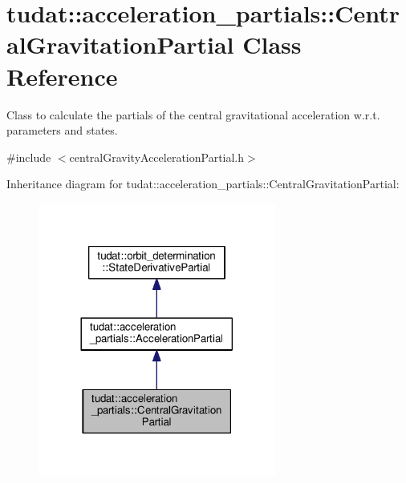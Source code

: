 \hypertarget{classtudat_1_1acceleration__partials_1_1CentralGravitationPartial}{}\section{tudat\+:\+:acceleration\+\_\+partials\+:\+:Central\+Gravitation\+Partial Class Reference}
\label{classtudat_1_1acceleration__partials_1_1CentralGravitationPartial}


Class to calculate the partials of the central gravitational acceleration w.\+r.\+t. parameters and states.  




{\ttfamily \#include $<$central\+Gravity\+Acceleration\+Partial.\+h$>$}



Inheritance diagram for tudat\+:\+:acceleration\+\_\+partials\+:\+:Central\+Gravitation\+Partial\+:
\nopagebreak
\begin{figure}[H]
\begin{center}
\leavevmode
\includegraphics[width=221pt]{classtudat_1_1acceleration__partials_1_1CentralGravitationPartial__inherit__graph}
\end{center}
\end{figure}


